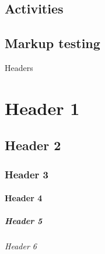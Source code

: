 \documentclass[
  letterpaper,
]{book}
\let\oldparagraph\paragraph
\renewcommand{\paragraph}[1]{\oldparagraph{#1}\mbox{}}
\let\oldsubparagraph\subparagraph
\renewcommand{\subparagraph}[1]{\oldsubparagraph{#1}\mbox{}}
\begin{document}
\hypertarget{activities}{%
\section{Activities}\label{activities}}

\hypertarget{markup-testing}{%
\section{Markup testing}\label{markup-testing}}

Headers


\hypertarget{header-1}{%
\chapter{Header 1}\label{header-1}}

\hypertarget{header-2}{%
\section{Header 2}\label{header-2}}

\hypertarget{header-3}{%
\subsection{Header 3}\label{header-3}}

\hypertarget{header-4}{%
\subsubsection{Header 4}\label{header-4}}

\hypertarget{header-5}{%
\paragraph{Header 5}\label{header-5}}

\hypertarget{header-6}{%
\subparagraph{Header 6}\label{header-6}}


\backmatter
\end{document}
